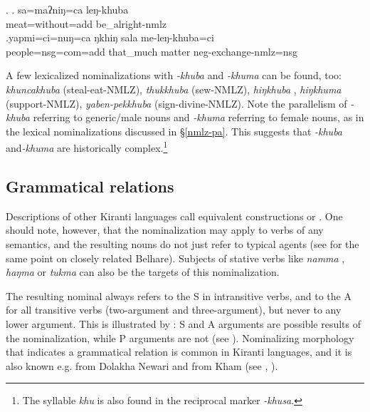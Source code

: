    \ex. \ag. sa=maʔniŋ=ca leŋ-khuba\\
		meat=without{\sc =add} be\_alright{\sc -nmlz}\\
	\bg.yapmi=ci=nuŋ=ca  ŋkhiŋ   sala   me-leŋ-khuba=ci\\
		people{\sc =nsg=com=add} that\_much matter {\sc neg}-exchange-{\sc nmlz=nsg}\\
	      

	
A few lexicalized nominalizations with \emph{-khuba} and \emph{-khuma} can be found, too: \emph{khuncakhuba}  (steal-eat-NMLZ), \emph{thukkhuba}  (sew-NMLZ), \emph{hiŋ\-khuba} , \emph{hiŋ\-khuma}  (support-NMLZ), \emph{yaben-pekkhuba}  (sign-divine-NMLZ). Note the parallelism of \emph{-khuba} referring to generic/male nouns and \emph{-khuma} referring to female nouns, as in the lexical nominalizations discussed in §\ref{nmlz-pa}. This suggests that \emph{-khuba} and\emph{-khuma} are historically complex.\footnote{The syllable \emph{khu} is also found in the reciprocal marker \emph{-khusa}.}

\subsection{Grammatical relations}\label{khuba-gr}

Descriptions of other Kiranti languages call equivalent constructions  or  \citep{Tolsma1999A-grammar, Rutgers1998Yamphu, Ebert1997A-grammar, Ebert1999Nonfinite, Doornenbal2009A-grammar}. One should note, however, that the nominalization may apply to verbs of any semantics, and the resulting nouns do not just refer to typical agents (see \citet[180]{Bickel2004Hidden} for the same point on closely related Belhare). Subjects of stative verbs like \emph{namma} , \emph{haŋma}  or \emph{tukma}  can also be the targets of this nominalization. 
 
The resulting nominal always refers to the S in intransitive verbs, and to the A for all transitive verbs (two-argument and three-argument), but never to any lower argument. This is illustrated by \Next: S and A arguments are possible results of the nominalization, while P arguments are not (see \Next[c]). Nominalizing morphology that indicates a grammatical relation is common in Kiranti languages, and it is also known e.g. from  Dolakha Newari and from Kham (see \citet[409]{Genetti1992Semantic}, \citet[376]{Ebert1999Nonfinite}). 
	
